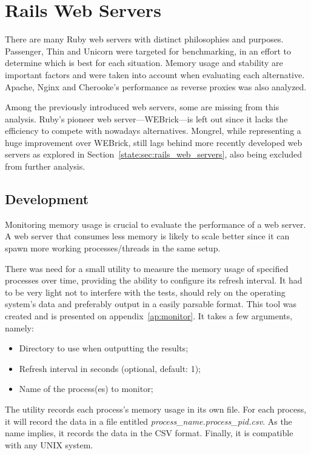 \section{Rails Web Servers} %
\label{solution:sec:rails_web_servers}

There are many Ruby web servers with distinct philosophies and purposes. Passenger, Thin and Unicorn were targeted for benchmarking, in an effort to determine which is best for each situation. Memory usage and stability are important factors and were taken into account when evaluating each alternative. Apache, Nginx and Cherooke's performance as reverse proxies was also analyzed.

Among the previously introduced web servers, some are missing from this analysis. Ruby's pioneer web server---WEBrick---is left out since it lacks the efficiency to compete with nowadays alternatives. Mongrel, while representing a huge improvement over WEBrick, still lags behind more recently developed web servers as explored in Section~\ref{state:sec:rails_web_servers}, also being excluded from further analysis.

\subsection{Development}
Monitoring memory usage is crucial to evaluate the performance of a web server. A web server that consumes less memory is likely to scale better since it can spawn more working processes/threads in the same setup.

There was need for a small utility to measure the memory usage of specified processes over time, providing the ability to configure its refresh interval. It had to be very light not to interfere with the tests, should rely on the operating system's data and preferably output in a easily parsable format. This tool was created and is presented on appendix~\ref{ap:monitor}. It takes a few arguments, namely:
\begin{itemize}
  \item Directory to use when outputting the results;
  \item Refresh interval in seconds (optional, default: 1);
  \item Name of the process(es) to monitor;
\end{itemize}
The utility records each process's memory usage in its own file. For each process, it will record the data in a file entitled \textit{process\_name.process\_pid.csv}. As the name implies, it records the data in the CSV format. Finally, it is compatible with any UNIX system.

